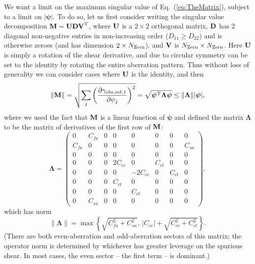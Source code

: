 \documentclass[aps,prd, amsmath,amssymb,superscriptaddress,showkeys,nofootinbib,reprint,preprintnumbers]{revtex4-1}
\begin{document}
\begin{widetext}
We want a limit on the maximum singular value of
Eq.~(\ref{eq:TheMatrix}), subject to a limit on
$|{\boldsymbol\psi}|$. To do so, let us first consider writing the
singular value decomposition ${\bf M} = {\bf UDV}^{\rm T}$, where
${\bf U}$ is a $2\times 2$ orthogonal matrix, ${\bf D}$ has 2 diagonal
non-negative entries in non-increasing order ($D_{11}\ge D_{22}$) and
is otherwise zeroes (and has dimension $2\times N_{\rm Zern}$), and
${\bf V}$ is $N_{\rm Zern}\times N_{\rm Zern}$. Here ${\bf U}$ is
simply a rotation of the shear derivative, and due to circular
symmetry can be set to the identity by rotating the entire aberration
pattern. Thus without loss of generality we can consider cases where
${\bf U}$ is the identity, and then
\begin{equation}
\lVert{\bf M} \rVert = \sqrt{ \sum_j \left(\frac{\partial \gamma_{{\rm obs,ref},1}}{\partial\psi_j} \right)^2 }
= \sqrt{ {\boldsymbol\psi}^{\rm T} {\boldsymbol\Lambda}{\boldsymbol\psi} }
\le \lVert{\boldsymbol\Lambda} \rVert |{\boldsymbol\psi}|,
\end{equation}
where we used the fact that ${\bf M}$ is a linear function of ${\boldsymbol\psi}$ and defined the matrix ${\boldsymbol\Lambda}$ to be the matrix of derivatives of the first row of ${\bf M}$:
\begin{equation}
{\boldsymbol\Lambda} = \left( \begin{array}{cccccccc}
0 & C_{fa} & 0 & 0 & 0 & 0 & 0 & 0 \\
C_{fa} & 0 & 0 & 0 & 0 & 0 & 0 & C_{sa} \\
0 & 0 & 0 & 0 & 0 & 0 & 0 & 0 \\
0 & 0 & 0 & 2C_{cc} & 0 & C_{ct} & 0 & 0 \\
0 & 0 & 0 & 0 & -2C_{cc} & 0 & C_{ct} & 0 \\
0 & 0 & 0 & C_{ct} & 0 & 0 & 0 & 0 \\
0 & 0 & 0 & 0 & C_{ct} & 0 & 0 & 0 \\
0 & C_{sa} & 0 & 0 & 0 & 0 & 0 & 0
\end{array} \right),
\end{equation}
which has norm
\begin{equation}
\lVert {\boldsymbol\Lambda} \rVert = \max \left\{
\sqrt{C_{fa}^2 + C_{sa}^2}, ~|C_{cc}|+\sqrt{C_{cc}^2+C_{ct}^2}
\right\}.
\label{eq:LambdaNorm}
\end{equation}
(There are both even-aberration and odd-aberration sectors of this
matrix; the operator norm is determined by whichever has greater
leverage on the spurious shear. In most cases, the even sector -- the
first term -- is dominant.)


\end{widetext}
\end{document}
